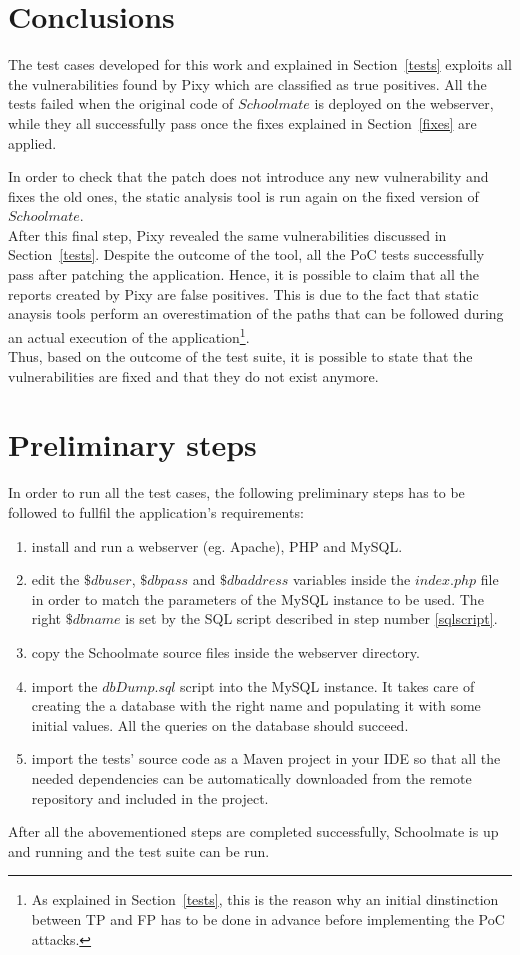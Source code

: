 \documentclass{sig-alternate-05-2015}
\begin{document}
\section{Conclusions}\label{outcomes}
The test cases developed for this work and explained in Section~\ref{tests} exploits all the
vulnerabilities found by Pixy which are classified as true positives. All the tests failed when
the original code of $Schoolmate$ is deployed on the webserver, while they all successfully pass
once the fixes explained in Section~\ref{fixes} are applied.

In order to check that the patch does not introduce any new vulnerability and fixes the old ones,
the static analysis tool is run again on the fixed version of $Schoolmate$.\\
After this final step, Pixy revealed the same vulnerabilities discussed in Section~\ref{tests}.
Despite the outcome of the tool, all the PoC tests successfully pass after patching the application.
Hence, it is possible to claim that all the reports created by Pixy are false positives.
This is due to the fact that static anaysis
tools perform an overestimation of the paths that can be followed during an actual execution
of the application\footnote{As explained in Section~\ref{tests}, this is the reason why an initial
dinstinction between TP and FP has to be done in advance before implementing the PoC attacks.}.\\
Thus, based on the outcome of the test suite, it is possible to state that the vulnerabilities are
fixed and that they do not exist anymore.


\section{Preliminary steps}\label{steps}
In order to run all the test cases, the following preliminary steps has to be followed
to fullfil the application's requirements:
\begin{enumerate}
    \item install and run a webserver (eg. Apache), PHP and MySQL.
    \item edit the $\$dbuser$, $\$dbpass$ and $\$dbaddress$ variables inside the $index.php$ file in
        order to match the parameters of the MySQL instance to be used. The right $\$dbname$ is set
        by the SQL script described in step number \ref{sqlscript}.
    \item copy the Schoolmate source files inside the webserver directory.
    \item \label{sqlscript} import the $dbDump.sql$ script into the MySQL instance. It takes care of
        creating the a database with the right name and populating it with some initial values.
        All the queries on the database should succeed.
    \item import the tests' source code as a Maven project in your IDE so that all the
        needed dependencies can be automatically downloaded from the remote repository
        and included in the project.
\end{enumerate}
After all the abovementioned steps are completed successfully, Schoolmate is up and running
and the test suite can be run.
\end{document}
